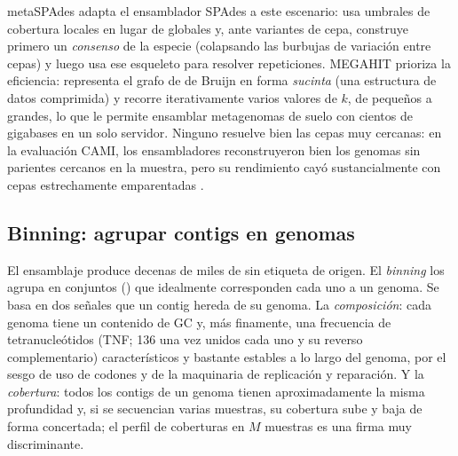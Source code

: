 metaSPAdes \parencite{c14-nurk2017} adapta el ensamblador SPAdes a este escenario: usa umbrales de cobertura locales en lugar de globales y, ante variantes de cepa, construye primero un \emph{consenso} de la especie (colapsando las burbujas de variación entre cepas) y luego usa ese esqueleto para resolver repeticiones. MEGAHIT \parencite{c14-li2015} prioriza la eficiencia: representa el grafo de de Bruijn en forma \emph{sucinta} (una estructura de datos comprimida) y recorre iterativamente varios valores de $k$, de pequeños a grandes, lo que le permite ensamblar metagenomas de suelo con cientos de gigabases en un solo servidor. Ninguno resuelve bien las cepas muy cercanas: en la evaluación CAMI, los ensambladores reconstruyeron bien los genomas sin parientes cercanos en la muestra, pero su rendimiento cayó sustancialmente con cepas estrechamente emparentadas \parencite{c14-sczyrba2017}.

\subsection{Binning: agrupar contigs en genomas}

El ensamblaje produce decenas de miles de  sin etiqueta de origen. El \emph{binning} los agrupa en conjuntos () que idealmente corresponden cada uno a un genoma. Se basa en dos señales que un contig hereda de su genoma. La \emph{composición}: cada genoma tiene un contenido de GC y, más finamente, una frecuencia de tetranucleótidos (TNF; 136 una vez unidos cada uno y su reverso complementario) característicos y bastante estables a lo largo del genoma, por el sesgo de uso de codones y de la maquinaria de replicación y reparación. Y la \emph{cobertura}: todos los contigs de un genoma tienen aproximadamente la misma profundidad y, si se secuencian varias muestras, su cobertura sube y baja de forma concertada; el perfil de coberturas en $M$ muestras es una firma muy discriminante.

